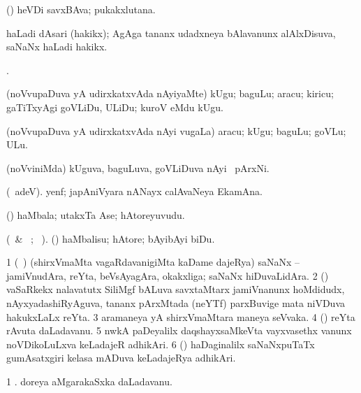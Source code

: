 \bentry
{}
\gl{\nA} 
\bmng
(\AmA) 
heVDi savxBAva; pukakxlutana.
\emng
\eentry

\bentry
{}
\gl{\nA} 
\bmng
haLadi dAsari (hakikx); AgAga tananx udadxneya bAlavanunx alAlxDisuva, saNaNx haLadi hakikx.
\emng
\eentry

\bentry
{} 
\gl{\gu} 
\bmng
{}.
\emng 
\eentry

\bentry
{} 
\gl{\akirx} 
\bmng
(noVvupaDuva yA udirxkatxvAda  nAyiyaMte) kUgu; baguLu; aracu; kiricu; gaTiTxyAgi goVLiDu, ULiDu; kuroV eMdu kUgu.
\emng
\eentry

\bentry
{} 
\gl{\nA} 
\bmng
(noVvupaDuva yA udirxkatxvAda nAyi \mo vugaLa) aracu; kUgu; baguLu; goVLu; ULu.
\emng
\eentry

\bentry
{} 
\gl{\nA} 
\bmng
(noVviniMda) kUguva, baguLuva, goVLiDuva nAyi \mo\ pArxNi.
\emng
\eentry

\bentry
{} 
\gl{\nA} 
\bmng
(\bava\ adeV).
yenf; japAniVyara nANayx calAvaNeya EkamAna.
\emng
\eentry

\bentry
{} 
\gl{\nA} 
\bmng
(\AmA) haMbala; utakxTa Ase; hAtoreyuvudu.
\emng
\eentry

\bentry
{} 
\gl{\akirx} 
\bmng
(\BU\ \& \BUkaq\ ; \vakaq\ ).
(\AmA) haMbalisu; hAtore; bAyibAyi biDu.
\emng 
\eentry

\bentry
{} 
\gl{\nA} 
\bmng
\bnum
\num{1} (\kanmu\ \ca) (shirxVmaMta vagaRdavanigiMta kaDame dajeRya) saNaNx -- jamiVnudAra, reYta, beVsAyagAra, okakxliga; saNaNx hiDuvaLidAra. 
\num{2} (\ca) vaSaRkekx nalavatutx SiliMgf bALuva savxtaMtarx jamiVnanunx hoMdidudx, nAyxyadashiRyAguva, tananx pArxMtada (neYTf) parxBuvige mata niVDuva hakukxLaLx reYta.  
\num{3} aramaneya yA shirxVmaMtara maneya seVvaka. 
\num{4} (\birx) reYta rAvuta daLadavanu. 
\hypertarget{yeoman(5)}{}
\num{5} nwkA paDeyalilx daqshayxsaMkeVta vayxvasethx \mo vanunx noVDikoLuLxva keLadajeR adhikAri. 
\num{6} (\ame) haDaginalilx saNaNxpuTaTx gumAsatxgiri kelasa mADuva keLadajeRya adhikAri.
\enum
\emng

\noindent                          
\gl{\pagu} 
\bmng
\bnum
\num{1}  .  
  
\banum
{} doreya aMgarakaSxka daLadavanu. 

